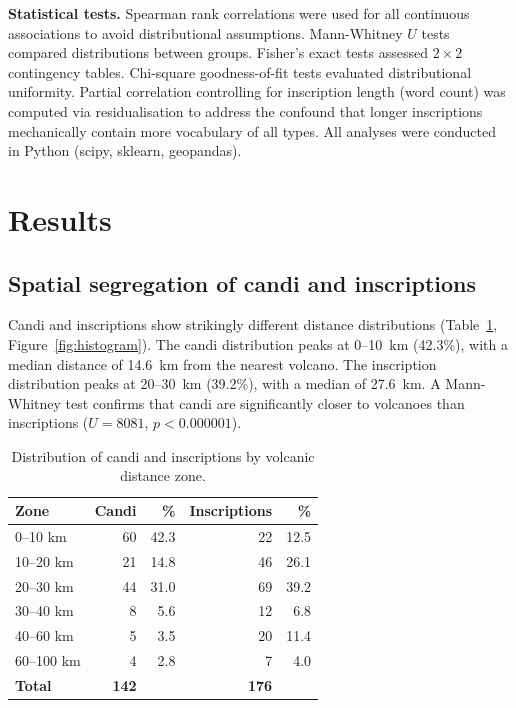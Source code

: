 \documentclass[12pt]{article}
\begin{document}
\textbf{Statistical tests.} Spearman rank correlations were used for all continuous associations to avoid distributional assumptions.
Mann-Whitney $U$ tests compared distributions between groups.
Fisher's exact tests assessed $2 \times 2$ contingency tables.
Chi-square goodness-of-fit tests evaluated distributional uniformity.
Partial correlation controlling for inscription length (word count) was computed via residualisation to address the confound that longer inscriptions mechanically contain more vocabulary of all types.
All analyses were conducted in Python (scipy, sklearn, geopandas).


\section{Results}

\subsection{Spatial segregation of candi and inscriptions}

Candi and inscriptions show strikingly different distance distributions (Table~\ref{tab:zones}, Figure~\ref{fig:histogram}).
The candi distribution peaks at 0--10~km (42.3\%), with a median distance of 14.6~km from the nearest volcano.
The inscription distribution peaks at 20--30~km (39.2\%), with a median of 27.6~km.
A Mann-Whitney test confirms that candi are significantly closer to volcanoes than inscriptions ($U = 8081$, $p < 0.000001$).

\begin{table}[htbp]
\centering
\caption{Distribution of candi and inscriptions by volcanic distance zone.}
\label{tab:zones}
\begin{tabular}{lrrrr}
\toprule
\textbf{Zone} & \textbf{Candi} & \textbf{\%} & \textbf{Inscriptions} & \textbf{\%} \\
\midrule
0--10 km   & 60 & 42.3 & 22 & 12.5 \\
10--20 km  & 21 & 14.8 & 46 & 26.1 \\
20--30 km  & 44 & 31.0 & 69 & 39.2 \\
30--40 km  &  8 &  5.6 & 12 &  6.8 \\
40--60 km  &  5 &  3.5 & 20 & 11.4 \\
60--100 km &  4 &  2.8 &  7 &  4.0 \\
\midrule
\textbf{Total} & \textbf{142} & & \textbf{176} & \\
\bottomrule
\end{tabular}
\end{table}
\end{document}
